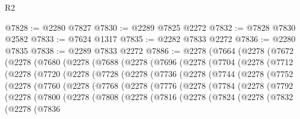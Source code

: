 \begin{lexlean}{R2}
\begin{coremodule}
@7828 := @2280 @7827
@7830 := @2289 @7825 @2272
@7832 := @7828 @7830 @2582
@7833 := @7624 @1317
@7835 := @2282 @7833 @2272
@7836 := @2280 @7835
@7838 := @2289 @7833 @2272
@7886 := @2278
    (@7664
      (@2278
        (@7672
          (@2278
            (@7680
              (@2278
                (@7688
                  (@2278
                    (@7696
                      (@2278
                        (@7704
                          (@2278
                            (@7712
                              (@2278
                                (@7720
                                  (@2278
                                    (@7728
                                      (@2278
                                        (@7736
                                          (@2278
                                            (@7744
                                              (@2278
                                                (@7752
                                                  (@2278
                                                    (@7760
                                                      (@2278
                                                        (@7768
                                                          (@2278
                                                            (@7776
                                                              (@2278
                                                                (@7784
                                                                  (@2278
                                                                    (@7792
                                                                      (@2278
                                                                        (@7800
                                                                          (@2278
                                                                            (@7808
                                                                              (@2278
                                                                                (@7816
                                                                                  (@2278
                                                                                    (@7824
                                                                                      (@2278
                                                                                        (@7832
                                                                                          (@2278
                                                                                            (@7836

\end{coremodule}
\end{lexlean}
